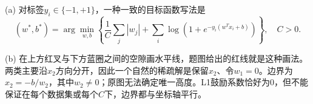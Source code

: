 (a) 对标签\(y_i\in\{-1,+1\}\)，一种一致的目标函数写法是
\[
(w^*,b^*)=\arg\min_{w,b}\left\{\frac1C\sum_j|w_j|+
\sum_i\log\!\left(1+e^{-y_i(w^Tx_i+b)}\right)\right\},\quad C>0.
\]


(b) 在上方红叉与下方蓝圈之间的空隙画水平线，题图给出的红线就是这种画法。两类主要沿\(x_2\)方向分开，因此一个自然的稀疏解是保留\(x_2\)、令\(w_1=0\)。边界为\(x_2=-b/w_2\)，其中\(w_2\ne0\)；原图无法确定唯一高度。L1鼓励系数恰好为0，但不能保证在每个数据集或每个\(C\)下，边界都与坐标轴平行。
